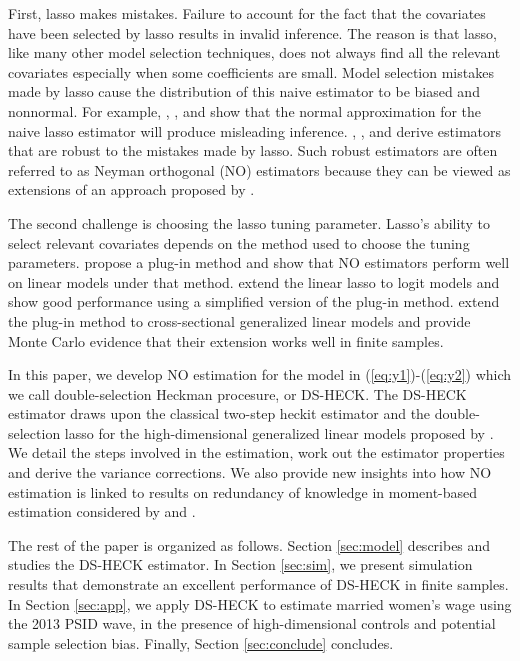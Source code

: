 \documentclass[11pt]{article}
\begin{document}
First, lasso makes mistakes. Failure to account for the fact that the covariates have been selected by lasso results in invalid inference.  The reason is that lasso, like many other model selection techniques, does not always find all the relevant covariates especially when some coefficients are small. Model selection mistakes made by lasso cause the distribution of this naive estimator to be biased and nonnormal. For example,  \cite*{LPotscher2008b},
\cite*{LPotscher2008}, and \cite*{PLeeb2009} %
show that the normal approximation for the 
naive lasso estimator will produce misleading inference.
\cite*{bellonichernozhukovhansen2014}, \cite*{bellonichernozhukovwei2016}, and
\cite{cherno/etal:18} derive estimators that are robust to the mistakes made by lasso.  Such robust estimators are often referred to as Neyman orthogonal (NO) estimators because they can be viewed as extensions of an approach proposed by \cite*{Neyman1959}.

The second challenge is choosing the lasso tuning parameter.  Lasso's ability to select relevant covariates depends on the method used to choose the tuning parameters.
\cite*{bellonichernozhukovhansen2014} propose a plug-in method and show that NO estimators perform well on linear models under that method.  \cite*{bellonichernozhukovwei2016} extend the linear lasso to logit models and show good performance using a simplified version of the plug-in method.  \cite*{drukker/liu:22} extend the plug-in method to cross-sectional generalized linear models and  provide Monte Carlo evidence that their extension works well in finite samples.  


In this paper, we develop NO estimation for the model in (\ref{eq:y1})-(\ref{eq:y2}) which we call double-selection Heckman procesure, or DS-HECK. %
The DS-HECK %
estimator draws upon the
classical two-step heckit estimator and the
double-selection lasso for the high-dimensional generalized linear
models proposed by \cite*{bellonichernozhukovwei2016}. We detail the steps involved in the estimation, work out the estimator properties and derive the variance corrections. We also provide new insights into how NO estimation is linked to results on redundancy of knowledge in moment-based estimation considered by \cite*{breusch/etal:99} and \cite{prokhorov/schmidt:09}.


The rest of the paper is organized as follows. Section \ref{sec:model} describes and studies the DS-HECK %
estimator.  In Section \ref{sec:sim}, we present simulation results that demonstrate an excellent performance of DS-HECK %
in finite samples. In
Section \ref{sec:app}, we apply DS-HECK %
to estimate married women's wage using the 2013 PSID wave, 
in the presence of high-dimensional controls and potential sample selection bias. Finally, Section \ref{sec:conclude} concludes. 
\end{document}
